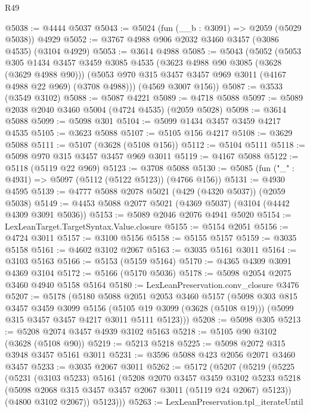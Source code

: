 \begin{lexlean}{R49}
\begin{coremodule}
@5038 := @4444 @5037
@5043 := @5024 (fun (__b : @3091) => @2059 (@5029 @5038)) @4929
@5052 := @3767 @4988 @906 @2032 @3460 @3457 (@3086 @4535) (@3104 @4929)
@5053 := @3614 @4988
@5085 := @5043
    (@5052
      (@5053
        @305
        @1434
        @3457
        @3459
        @3085
        @4535
        (@3623 @4988 @90 @3085 (@3628 (@3629 @4988 @90)))
        (@5053 @970 @315 @3457 @3457 @969 @3011 (@4167 @4988 @22 @969) (@3708 @4988)))
      (@4569 @3007 @156))
@5087 := @3533 (@3549 @3102)
@5088 := @5087 @4221
@5089 := @4718 @5088
@5097 := @5089 @2038 @2040 @3460 @5004 (@4724 @4535) (@2059 @5028)
@5098 := @3614 @5088
@5099 := @5098 @301
@5104 := @5099 @1434 @3457 @3459 @4217 @4535
@5105 := @3623 @5088
@5107 := @5105 @156 @4217
@5108 := @3629 @5088
@5111 := @5107 (@3628 (@5108 @156))
@5112 := @5104 @5111
@5118 := @5098 @970 @315 @3457 @3457 @969 @3011
@5119 := @4167 @5088
@5122 := @5118 (@5119 @22 @969)
@5123 := @3708 @5088
@5130 := @5085 (fun ("_" : @4931) => @5097 (@5112 (@5122 @5123)) (@4766 @156))
@5131 := @4930 @4595
@5139 := @4777 @5088 @2078 @5021 (@429 (@4320 @5037)) (@2059 @5038)
@5149 := @4453 @5088 @2077 @5021 (@4369 @5037) (@3104 (@4442 @4309 @3091 @5036))
@5153 := @5089 @2046 @2076 @4941 @5020
@5154 := LexLeanTarget.TargetSyntax.Value.closure
@5155 := @5154 @2051
@5156 := @4724 @3011
@5157 := @3100 @5156
@5158 := @5155 @5157
@5159 := @3035 @5158
@5161 := @4602 @3102 @2067
@5163 := @3035 @5161 @3011
@5164 := @3103 @5163
@5166 := @5153 (@5159 @5164)
@5170 := @4365 @4309 @3091 @4369 @3104
@5172 := @5166 (@5170 @5036)
@5178 := @5098 @2054 @2075 @3460 @4940 @5158 @5164
@5180 := LexLeanPreservation.conv_closure @3476
@5207 := @5178
    (@5180
      @5088
      @2051
      @2053
      @3460
      @5157
      (@5098
        @303
        @815
        @3457
        @3459
        @3099
        @5156
        (@5105 @19 @3099 (@3628 (@5108 @19)))
        (@5099 @315 @3457 @3457 @4217 @3011 @5111 @5123)))
@5208 := @5098 @305
@5213 := @5208 @2074 @3457 @4939 @3102 @5163
@5218 := @5105 @90 @3102 (@3628 (@5108 @90))
@5219 := @5213 @5218
@5225 := @5098 @2072 @315 @3948 @3457 @5161 @3011
@5231 := @3596 @5088 @423 @2056 @2071 @3460 @3457
@5233 := @3035 @2067 @3011
@5262 := @5172
    (@5207
      (@5219
        (@5225
          (@5231
            (@3103 @5233)
            @5161
            (@5208
              @2070
              @3457
              @3459
              @3102
              @5233
              @5218
              (@5098 @2068 @315 @3457 @3457 @2067 @3011 (@5119 @24 @2067) @5123))
            (@4800 @3102 @2067))
          @5123)))
@5263 := LexLeanPreservation.tpl_iterateUntil

\end{coremodule}
\end{lexlean}
